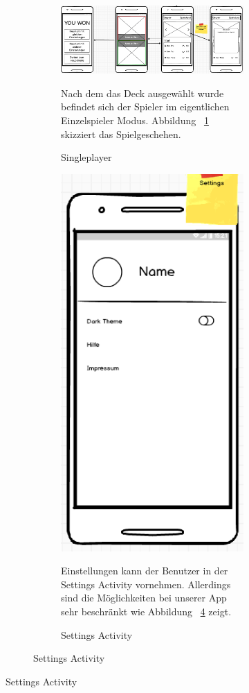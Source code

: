 \documentclass{scrartcl}
\begin{document}
\begin{figure}[!ht]
\begin{figure}[!ht]
\begin{figure}[!ht]
\begin{center}
	\includegraphics[scale=0.55]{img/mockup_game_process_2.png}
	\caption{Singleplayer}
	\label{singleplayer2}
\end{center}
Nach dem das Deck ausgewählt wurde befindet sich der Spieler im eigentlichen Einzelspieler Modus. Abbildung ~\ref{singleplayer2} skizziert das Spielgeschehen.
\end{figure}

\begin{figure}[!ht]
\begin{center}
	\centering
	\includegraphics[scale=0.6]{img/mockup_settings.png}
	\caption{Settings Activity}
	\label{settings}
\end{center}
Einstellungen kann der Benutzer in der Settings Activity vornehmen. Allerdings sind die Möglichkeiten bei unserer App sehr beschränkt wie Abbildung ~\ref{settings} zeigt.
\end{figure}


\end{figure}
\end{figure}
\end{document}
